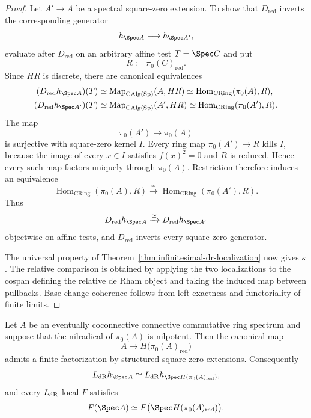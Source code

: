 \begin{proof}
Let $A'\to A$ be a spectral square-zero extension.  To show that
$D_{\mathrm{red}}$ inverts the corresponding generator
\[
    h_{\Spec A}\longrightarrow h_{\Spec A'},
\]
evaluate after $D_{\mathrm{red}}$ on an arbitrary affine test
$T=\Spec C$ and put
\[
    R:=\pi_0(C)_{\mathrm{red}}.
\]
Since $HR$ is discrete, there are canonical equivalences
\[
\begin{aligned}
    (D_{\mathrm{red}}h_{\Spec A})(T)
    &\simeq
    \Map_{\CAlg(\Sp)}(A,HR)
    \simeq
    \operatorname{Hom}_{\operatorname{CRing}}(\pi_0(A),R),\\
    (D_{\mathrm{red}}h_{\Spec A'})(T)
    &\simeq
    \Map_{\CAlg(\Sp)}(A',HR)
    \simeq
    \operatorname{Hom}_{\operatorname{CRing}}(\pi_0(A'),R).
\end{aligned}
\]
The map
\[
    \pi_0(A')\longrightarrow\pi_0(A)
\]
is surjective with square-zero kernel $I$.  Every ring map
$\pi_0(A')\to R$ kills $I$, because the image of every $x\in I$ satisfies
$f(x)^2=0$ and $R$ is reduced.  Hence every such map factors uniquely through
$\pi_0(A)$.  Restriction therefore induces an equivalence
\[
    \operatorname{Hom}_{\operatorname{CRing}}(\pi_0(A),R)
    \xrightarrow{\simeq}
    \operatorname{Hom}_{\operatorname{CRing}}(\pi_0(A'),R).
\]
Thus
\[
    D_{\mathrm{red}}h_{\Spec A}
    \xrightarrow{\simeq}
    D_{\mathrm{red}}h_{\Spec A'}
\]
objectwise on affine tests, and $D_{\mathrm{red}}$ inverts every square-zero
generator.

The universal property of
Theorem~\ref{thm:infinitesimal-dr-localization} now gives $\kappa$.  The
relative comparison is obtained by applying the two localizations to the
cospan defining the relative de Rham object and taking the induced map between
pullbacks.  Base-change coherence follows from left exactness and functoriality
of finite limits.
\end{proof}

\begin{proposition}
\label{prop:infinitesimal-finite-collapse}
Let $A$ be an eventually coconnective connective commutative ring spectrum and
suppose that the nilradical of $\pi_0(A)$ is nilpotent.  Then the canonical
map
\[
    A\longrightarrow H\bigl(\pi_0(A)_{\mathrm{red}}\bigr)
\]
admits a finite factorization by structured square-zero extensions.
Consequently
\[
    L_{\dR}h_{\Spec A}
    \simeq
    L_{\dR}h_{\Spec H(\pi_0(A)_{\mathrm{red}})},
\]
and every $L_{\mathrm{dR}}$-local $F$ satisfies
\[
    F(\Spec A)
    \simeq
    F\bigl(\Spec H(\pi_0(A)_{\mathrm{red}})\bigr).
\]
\end{proposition}

